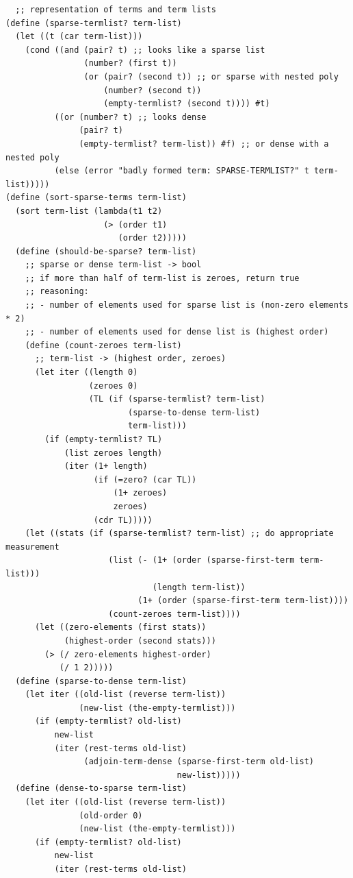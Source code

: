 \documentclass[final,fleqn,titlepage,twoside]{article}
\begin{document}
\begin{verbatim}
  ;; representation of terms and term lists
(define (sparse-termlist? term-list)
  (let ((t (car term-list)))
    (cond ((and (pair? t) ;; looks like a sparse list
                (number? (first t))
                (or (pair? (second t)) ;; or sparse with nested poly
                    (number? (second t))
                    (empty-termlist? (second t)))) #t)
          ((or (number? t) ;; looks dense
               (pair? t)
               (empty-termlist? term-list)) #f) ;; or dense with a nested poly
          (else (error "badly formed term: SPARSE-TERMLIST?" t term-list)))))
(define (sort-sparse-terms term-list)
  (sort term-list (lambda(t1 t2)
                    (> (order t1)
                       (order t2)))))
  (define (should-be-sparse? term-list)
    ;; sparse or dense term-list -> bool
    ;; if more than half of term-list is zeroes, return true
    ;; reasoning:
    ;; - number of elements used for sparse list is (non-zero elements * 2)
    ;; - number of elements used for dense list is (highest order)
    (define (count-zeroes term-list)
      ;; term-list -> (highest order, zeroes)
      (let iter ((length 0)
                 (zeroes 0)
                 (TL (if (sparse-termlist? term-list)
                         (sparse-to-dense term-list)
                         term-list)))
        (if (empty-termlist? TL)
            (list zeroes length)
            (iter (1+ length)
                  (if (=zero? (car TL))
                      (1+ zeroes)
                      zeroes)
                  (cdr TL)))))
    (let ((stats (if (sparse-termlist? term-list) ;; do appropriate measurement
                     (list (- (1+ (order (sparse-first-term term-list)))
                              (length term-list))
                           (1+ (order (sparse-first-term term-list))))
                     (count-zeroes term-list))))
      (let ((zero-elements (first stats))
            (highest-order (second stats)))
        (> (/ zero-elements highest-order)
           (/ 1 2)))))
  (define (sparse-to-dense term-list)
    (let iter ((old-list (reverse term-list))
               (new-list (the-empty-termlist)))
      (if (empty-termlist? old-list)
          new-list
          (iter (rest-terms old-list)
                (adjoin-term-dense (sparse-first-term old-list)
                                   new-list)))))
  (define (dense-to-sparse term-list)
    (let iter ((old-list (reverse term-list))
               (old-order 0)
               (new-list (the-empty-termlist)))
      (if (empty-termlist? old-list)
          new-list
          (iter (rest-terms old-list)

\end{verbatim}
\end{document}
